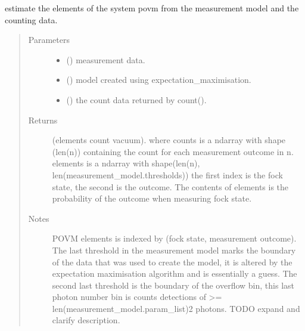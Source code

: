 \documentclass[letterpaper,10pt,english]{sphinxmanual}
\begin{document}

\begin{fulllineitems}
\label{\detokenize{tes:tes.analysis.povm_elements}}
\sphinxAtStartPar
estimate the elements of the system povm from the measurement model and the
counting data.
\begin{quote}\begin{description}
\item[{Parameters}] \leavevmode\begin{itemize}
\item {} 
\sphinxAtStartPar
{} () \textendash{} measurement data.

\item {} 
\sphinxAtStartPar
{} () \textendash{} model created using
expectation\_maximisation.

\item {} 
\sphinxAtStartPar
{} ({\hyperref[\detokenize{tes:tes.analysis.Counts}]{}}) \textendash{} the count data returned by count().

\end{itemize}

\item[{Returns}] \leavevmode
\sphinxAtStartPar
(elements count vacuum). where counts is a ndarray with
shape (len(n)) containing the count for each measurement outcome
in n. elements is a ndarray with
shape(len(n), len(measurement\_model.thresholds)) the first index is
the fock state, the second is the outcome. The contents of elements
is the probability of the outcome when measuring fock state.

\item[{Notes}] \leavevmode
\sphinxAtStartPar
POVM elements is indexed by (fock state, measurement outcome).
The last threshold in the measurement model marks the boundary of
the data that was used to create the model, it is  altered by
the expectation maximisation algorithm and is essentially a guess.
The second last threshold is the boundary of the overflow bin,
this last photon number bin is counts detections of \textgreater{}=
len(measurement\_model.param\_list)\sphinxhyphen{}2 photons.
TODO expand and clarify description.

\end{description}\end{quote}

\end{fulllineitems}
\end{document}
